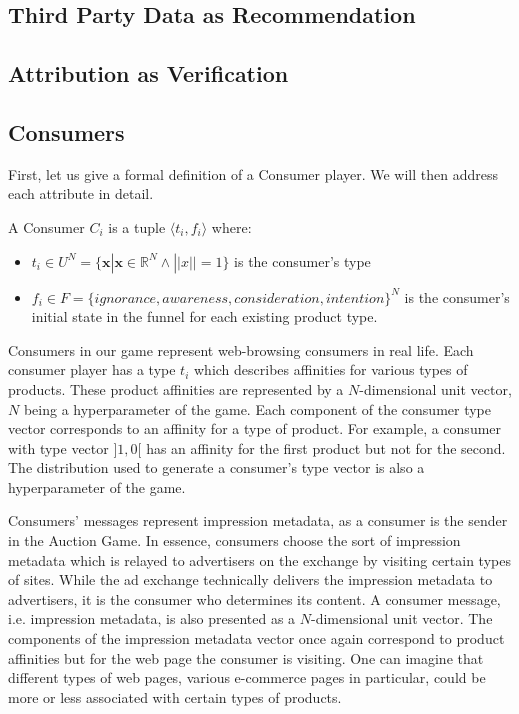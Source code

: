 \documentclass{article}
\begin{document}
\subsection{Third Party Data as Recommendation}

\subsection{Attribution as Verification}

\subsection{Consumers}

First, let us give a formal definition of a Consumer player. We will then address each attribute in detail.

A Consumer $C_i$ is a tuple $\langle t_i, f_i \rangle$ where:

\begin{itemize}
	\item $t_i \in U^N = \{\bm{x} | \bm{x} \in \mathbb{R}^N \wedge ||x|| = 1\}$ is the consumer's type
	\item $f_i \in F = \{ignorance, awareness, consideration, intention\}^N$ is the consumer's initial state in the funnel for each existing product type. 
\end{itemize}

Consumers in our game represent web-browsing consumers in real life. Each consumer player has a type $t_i$ which describes affinities for various types of products. These product affinities are represented by a $N$-dimensional unit vector, $N$ being a hyperparameter of the game. Each component of the consumer type vector corresponds to an affinity for a type of product. For example, a consumer with type vector $\rbrack 1, 0 \lbrack$ has an affinity for the first product but not for the second. The distribution used to generate a consumer's type vector is also a hyperparameter of the game.

Consumers' messages represent impression metadata, as a consumer is the sender in the Auction Game. In essence, consumers choose the sort of impression metadata which is relayed to advertisers on the exchange by visiting certain types of sites. While the ad exchange technically delivers the impression metadata to advertisers, it is the consumer who determines its content. A consumer message, i.e. impression metadata, is also presented as a $N$-dimensional unit vector. The components of the impression metadata vector once again correspond to product affinities but for the web page the consumer is visiting. One can imagine that different types of web pages, various e-commerce pages in particular, could be more or less associated with certain types of products. 
\end{document}
